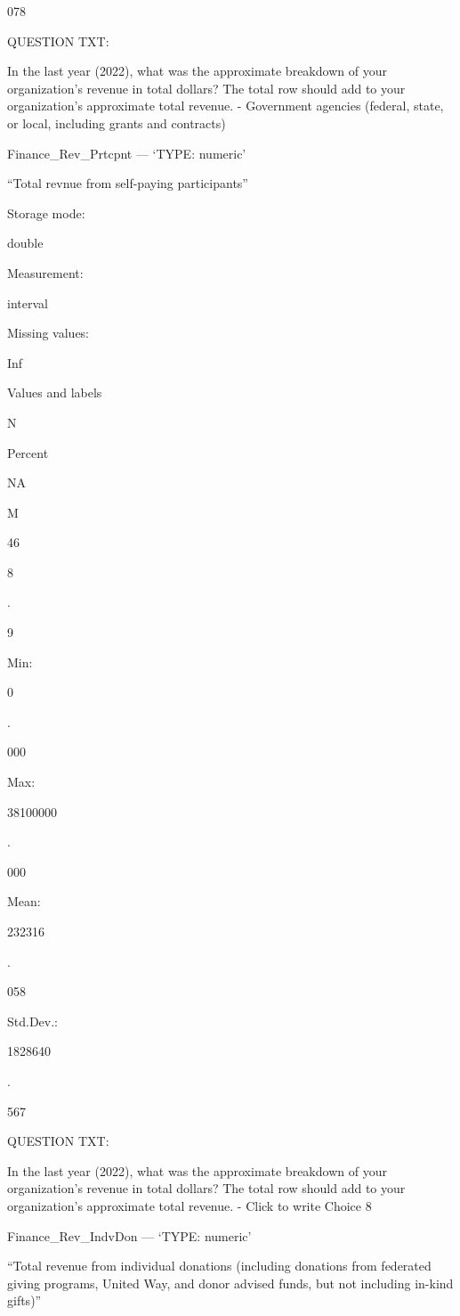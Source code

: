 \documentclass[
  letterpaper,
]{scrbook}
\begin{document}
078

QUESTION TXT:

In the last year (2022), what was the approximate breakdown of your
organization's revenue in total dollars? The total row should add to
your organization's approximate total revenue. - Government agencies
(federal, state, or local, including grants and contracts)

Finance\_Rev\_Prtcpnt --- {`TYPE: numeric'}

``Total revnue from self-paying participants''

Storage mode:

double

Measurement:

interval

Missing values:

Inf

Values and labels

N

Percent

NA

M

46

8

.

9

Min:

0

.

000

Max:

38100000

.

000

Mean:

232316

.

058

Std.Dev.:

1828640

.

567

QUESTION TXT:

In the last year (2022), what was the approximate breakdown of your
organization's revenue in total dollars? The total row should add to
your organization's approximate total revenue. - Click to write Choice 8

Finance\_Rev\_IndvDon --- {`TYPE: numeric'}

``Total revenue from individual donations (including donations from
federated giving programs, United Way, and donor advised funds, but not
including in-kind gifts)''
\end{document}
